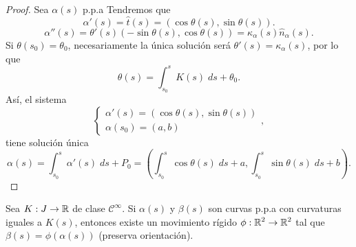 \begin{proof}
Sea $\displaystyle \alpha\left(s\right) $ p.p.a Tendremos que 
	\[\alpha'\left(s\right)=\hat{t}\left(s\right)=\left(\cos\theta\left(s\right), \sin\theta\left(s\right)\right) .\]
	\[\alpha''\left(s\right)=\theta'\left(s\right)\left(-\sin\theta\left(s\right), \cos\theta\left(s\right)\right)=\kappa_{\alpha }\left(s\right)\hat{n}_{\alpha }\left(s\right) .\] 
	Si $\displaystyle \theta\left(s_{0}\right)=\theta_{0} $, necesariamente la única solución será $\displaystyle \theta'\left(s\right) =\kappa_{\alpha }\left(s\right)$, por lo que
	\[\theta\left(s\right)=\int^{s}_{s_{0}} K\left(s\right) \; d s + \theta_{0} .\]
	Así, el sistema 
	\[
	\begin{cases}
	\alpha'\left(s\right)=\left(\cos\theta\left(s\right), \sin\theta\left(s\right)\right)\\
	\alpha\left(s_{0}\right)=\left(a,b\right)
	\end{cases}
	,\]
	tiene solución única  
	\[\alpha\left(s\right)=\int^{s}_{s_{0}} \alpha'\left(s\right) \; d s + P_{0} = \left(\int^{s}_{s_{0}} \cos\theta\left(s\right) \; d s + a, \int^{s}_{s_{0}} \sin\theta\left(s\right) \; d s + b\right) .\]
\end{proof}
\begin{colorary}
Sea $\displaystyle K : J \to \mathbb{R} $ de clase $\displaystyle \mathcal{C}^{\infty } $. Si $\displaystyle \alpha\left(s\right) $ y $\displaystyle \beta\left(s\right) $ son curvas p.p.a con curvaturas iguales a $\displaystyle K\left(s\right) $, entonces existe un movimiento rígido $\displaystyle \phi:\mathbb{R}^{2}\to \mathbb{R}^{2} $ tal que $\displaystyle \beta\left(s\right)=\phi\left(\alpha\left(s\right)\right) $ (preserva orientación). 
\end{colorary}
